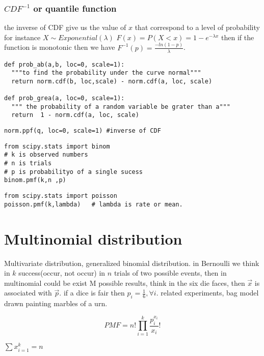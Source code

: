 \documentclass[10pt,a4paper]{article}
\begin{document}
\subsubsection{$CDF^{-1}$ or quantile function}
the inverse of CDF give us the value of $x$ that correspond to a level of probability for instance $X \sim Exponential(\lambda)$
$F(x) = P(X < x) = 1 - e^{- \lambda x}$ then if the function is monotonic then we have $F^{-1}(p)  = \frac{-ln(1-p)}{\lambda}$.




\begin{lstlisting}
def prob_ab(a,b, loc=0, scale=1):
  """to find the probability under the curve normal"""
  return norm.cdf(b, loc,scale) - norm.cdf(a, loc, scale)
 
def prob_grea(a, loc=0, scale=1):
  """ the probability of a random variable be grater than a"""
  return  1 - norm.cdf(a, loc, scale)
\end{lstlisting}

\begin{lstlisting}
norm.ppf(q, loc=0, scale=1) #inverse of CDF
\end{lstlisting}

\begin{lstlisting}
from scipy.stats import binom
# k is observed numbers
# n is trials
# p is probabilityo of a single sucess
binom.pmf(k,n ,p) 
\end{lstlisting}

\begin{lstlisting}
from scipy.stats import poisson
poisson.pmf(k,lambda)   # lambda is rate or mean.
\end{lstlisting}


\section{Multinomial distribution}
Multivariate distribution, generalized binomial distribution. in Bernoulli we think in $k$ success(occur, not occur) in $n$ trials of two possible events, then in multinomial could be exist M possible results, think in the six die faces, then  $\vec{x}$ is associated with $\vec{p}$. if a dice is fair then $p_{i} =\frac{1}{6},\forall i$. 
related experiments, bag model drawn painting marbles of a urn.



$$ PMF  =  n! \prod_{i=1}^{k} \frac{p_{i}^{x_{i}}}{x_{i}}!$$

$\sum x_{i=1}^{k} = n$
\end{document}
